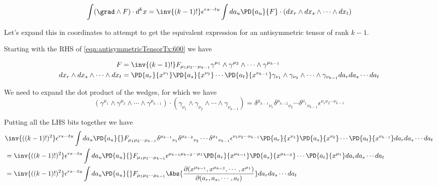 \begin{equation}\label{eqn:antisymmetricTensorTx:600}
\int
( \grad \wedge F ) \cdot d^k x 
=
\inv{(k-1)!} \epsilon^{ r s \cdots t u } \int da_u \PD{a_{u}}{F} \cdot 
(dx_r \wedge dx_s \wedge \cdots \wedge dx_t)
\end{equation}

Let's expand this in coordinates to attempt to get the equivalent expression for an antisymmetric tensor of rank $k-1$.

Starting with the RHS of \ref{eqn:antisymmetricTensorTx:600} we have

\begin{align}\label{eqn:antisymmetricTensorTx:610}
F &= \inv{(k-1)!}
F_{\mu_1 \mu_2 \cdots \mu_{k-1} }
\gamma^{\mu_1} \wedge \gamma^{ \mu_2 } \wedge \cdots \wedge \gamma^{\mu_{k-1}} 
\\
dx_r \wedge dx_s \wedge \cdots \wedge dx_t &=
\PD{a_r}{x^{\nu_1}}
\PD{a_s}{x^{\nu_2}}
\cdots
\PD{a_t}{x^{\nu_{k-1}}}
\gamma_{\nu_1} \wedge \gamma_{ \nu_2 } \wedge \cdots \wedge \gamma_{\nu_{k-1}}
da_r da_s \cdots da_t
\end{align}

We need to expand the dot product of the wedges, for which we have
\begin{equation}\label{eqn:antisymmetricTensorTx:620}
\left( 
\gamma^{\mu_1} \wedge \gamma^{ \mu_2 } \wedge \cdots \wedge \gamma^{\mu_{k-1}} 
\right) 
\cdot
\left( 
\gamma_{\nu_1} \wedge \gamma_{ \nu_2 } \wedge \cdots \wedge \gamma_{\nu_{k-1}}
\right) 
=
{\delta^{\mu_{k-1}}}_{\nu_1}  {\delta^{ \mu_{k-2} }}_{\nu_2}  \cdots  {\delta^{\mu_{1}} }_{\nu_{k-1}}
\epsilon^{\nu_1 \nu_2 \cdots \nu_{k-1}}
\end{equation}

Putting all the LHS bits together we have
\begin{align*}
&\inv{((k-1)!)^2} \epsilon^{ r s \cdots t u } \int da_u \PD{a_{u}}{} F_{\mu_1 \mu_2 \cdots \mu_{k-1} }
{\delta^{\mu_{k-1}}}_{\nu_1}  {\delta^{ \mu_{k-2} }}_{\nu_2}  \cdots  {\delta^{\mu_{1}} }_{\nu_{k-1}}
\epsilon^{\nu_1 \nu_2 \cdots \nu_{k-1}}
\PD{a_r}{x^{\nu_1}}
\PD{a_s}{x^{\nu_2}}
\cdots
\PD{a_t}{x^{\nu_{k-1}}}
da_r da_s \cdots da_t \\
&=\inv{((k-1)!)^2} \epsilon^{ r s \cdots t u } \int da_u \PD{a_{u}}{} F_{\mu_1 \mu_2 \cdots \mu_{k-1} }
\epsilon^{\mu_{k-1} \mu_{k-2} \cdots \mu_{1}}
\PD{a_r}{x^{\mu_{k-1}}}
\PD{a_s}{x^{\mu_{k-2}}}
\cdots
\PD{a_t}{x^{\mu_1}}
da_r da_s \cdots da_t \\
&=
\inv{((k-1)!)^2} \epsilon^{ r s \cdots t u } \int da_u \PD{a_{u}}{} F_{\mu_1 \mu_2 \cdots \mu_{k-1} }
\Abs{\frac{\partial(
x^{\mu_{k-1}},x^{\mu_{k-2}},\cdots,x^{\mu_1}
)}{\partial(a_r, a_s, \cdots, a_t)}}
da_r da_s \cdots da_t \\
\end{align*}

